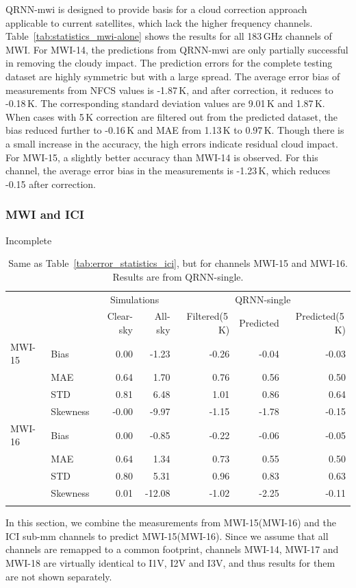 \documentclass[amt, manuscript]{copernicus}
\newcommand{\todo}[1]{{\color{red} #1}}
\begin{document}
QRNN-mwi is designed to provide basis for a cloud correction approach applicable to current satellites, which lack the higher frequency channels. Table~\ref{tab:statistics_mwi-alone} shows the results for all 183\,GHz channels of MWI. For MWI-14, the predictions from QRNN-mwi are only partially successful in removing the cloudy impact. The prediction errors for the complete testing dataset are highly symmetric but with a large spread. The average error bias of measurements from NFCS values is -1.87\,K, and after correction, it reduces to -0.18\,K. The corresponding standard deviation values are 9.01\,K and 1.87\,K. When cases with 5\,K correction are filtered out from the predicted dataset, the bias reduced further to -0.16\,K and MAE from 1.13\,K to 0.97\,K. Though there is a small increase in the accuracy, the high errors indicate residual cloud impact. For MWI-15, a slightly better accuracy than MWI-14 is observed. For this channel, the average error bias in the measurements is -1.23\,K, which  reduces -0.15 after correction.  
\subsubsection{MWI and ICI}
\todo{Incomplete}

\begin{table}[t]
	\caption{Same as Table~\ref{tab:error_statistics_ici}, but for channels MWI-15 and MWI-16. Results are from QRNN-single.}
	\label{tab:statistics_mwi}
	\begin{tabular}{llrr|rrr}
		\tophline
				&&\multicolumn{2}{c|}{Simulations}& \multicolumn{3}{c}{QRNN-single} \\
				\cline{3-7}
				&&   Clear-sky &   All-sky &  Filtered(5\,K) & Predicted & Predicted(5\,K) \\
		\middlehline
		MWI-15  &Bias     &  0.00 & -1.23 & -0.26 & -0.04 & -0.03 \\
				&MAE      &  0.64 &  1.70 &  0.76 &  0.56 &  0.50 \\
				&STD      &  0.81 &  6.48 &  1.01 &  0.86 &  0.64 \\
				&Skewness & -0.00 & -9.97 & -1.15 & -1.78 & -0.15 \\
		\middlehline
		MWI-16  &Bias     & 0.00 &  -0.85 & -0.22 & -0.06 & -0.05 \\
				&MAE      & 0.64 &   1.34 &  0.73 &  0.55 &  0.50 \\
				&STD      & 0.80 &   5.31 &  0.96 &  0.83 &  0.63 \\
				&Skewness & 0.01 & -12.08 & -1.02 & -2.25 & -0.11 \\
		\bottomhline			
	\end{tabular}	
	\belowtable{} %
\end{table}
In this section, we combine the measurements from MWI-15(MWI-16) and the ICI sub-mm channels to predict MWI-15(MWI-16). Since we assume that all channels are remapped to a common footprint, channels MWI-14, MWI-17 and MWI-18 are virtually identical to I1V, I2V and I3V, and thus results for them are not shown separately.
\end{document}
